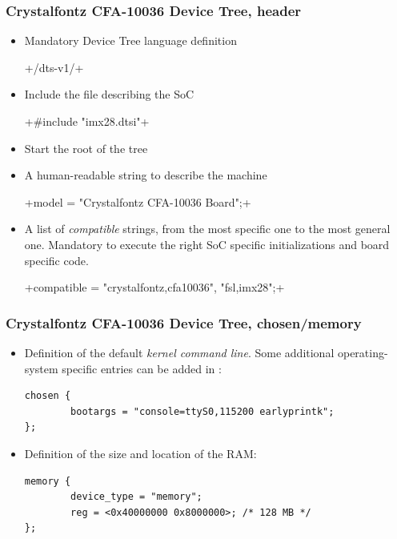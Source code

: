 \begin{frame}[fragile]
  \frametitle{Crystalfontz CFA-10036 Device Tree, header}
  \begin{itemize}
  \item Mandatory Device Tree language definition\\
    \begin{block}{} +/dts-v1/+ \end{block}
  \item Include the  file describing the SoC\\
    \begin{block}{}
      +#include "imx28.dtsi"+
    \end{block}
  \item Start the root of the tree\\
    \begin{block}{} +/ {+ \end{block}
  \item A human-readable string to describe the machine\\
    \begin{block}{}
      +model = "Crystalfontz CFA-10036 Board";+
    \end{block}
  \item A list of {\em compatible} strings, from the most specific one
    to the most general one. Mandatory to execute the right SoC specific
    initializations and board specific code.\\
    \begin{block}{}
      +compatible = "crystalfontz,cfa10036", "fsl,imx28";+
    \end{block}
  \end{itemize}
\end{frame}

\begin{frame}[fragile]
  \frametitle{Crystalfontz CFA-10036 Device Tree, chosen/memory}
  \begin{itemize}
  \item Definition of the default {\em kernel command line}. Some
    additional operating-system specific entries can be added in
    :
    \begin{block}{}
    \begin{verbatim}
chosen {
        bootargs = "console=ttyS0,115200 earlyprintk";
};
\end{verbatim}
\end{block}
\item Definition of the size and location of the RAM:
  \begin{block}{}
    \begin{verbatim}
memory {
        device_type = "memory";
        reg = <0x40000000 0x8000000>; /* 128 MB */
};
      \end{verbatim}
    \end{block}
  \end{itemize}
\end{frame}

